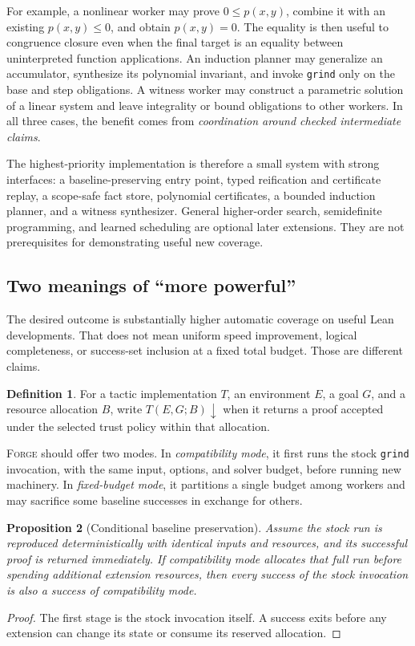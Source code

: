 \documentclass[11pt,a4paper]{article}
\newtheorem{proposition}{Proposition}[section]
\theoremstyle{definition}
\newtheorem{definition}[proposition]{Definition}
\newcommand{\forge}{\textsc{Forge}}
\newcommand{\grind}{\texttt{grind}}
\begin{document}
For example, a nonlinear worker may prove $0\le p(x,y)$, combine it with an existing $p(x,y)\le0$, and obtain $p(x,y)=0$. The equality is then useful to congruence closure even when the final target is an equality between uninterpreted function applications. An induction planner may generalize an accumulator, synthesize its polynomial invariant, and invoke \grind{} only on the base and step obligations. A witness worker may construct a parametric solution of a linear system and leave integrality or bound obligations to other workers. In all three cases, the benefit comes from \emph{coordination around checked intermediate claims}.

The highest-priority implementation is therefore a small system with strong interfaces: a baseline-preserving entry point, typed reification and certificate replay, a scope-safe fact store, polynomial certificates, a bounded induction planner, and a witness synthesizer. General higher-order search, semidefinite programming, and learned scheduling are optional later extensions. They are not prerequisites for demonstrating useful new coverage.

\subsection{Two meanings of ``more powerful''}

The desired outcome is substantially higher automatic coverage on useful Lean developments. That does not mean uniform speed improvement, logical completeness, or success-set inclusion at a fixed total budget. Those are different claims.

\begin{definition}
For a tactic implementation $T$, an environment $E$, a goal $G$, and a resource allocation $B$, write $T(E,G;B)\downarrow$ when it returns a proof accepted under the selected trust policy within that allocation.
\end{definition}

\forge{} should offer two modes. In \emph{compatibility mode}, it first runs the stock \grind{} invocation, with the same input, options, and solver budget, before running new machinery. In \emph{fixed-budget mode}, it partitions a single budget among workers and may sacrifice some baseline successes in exchange for others.

\begin{proposition}[Conditional baseline preservation]
Assume the stock run is reproduced deterministically with identical inputs and resources, and its successful proof is returned immediately. If compatibility mode allocates that full run before spending additional extension resources, then every success of the stock invocation is also a success of compatibility mode.
\end{proposition}
\begin{proof}
The first stage is the stock invocation itself. A success exits before any extension can change its state or consume its reserved allocation.
\end{proof}
\end{document}
